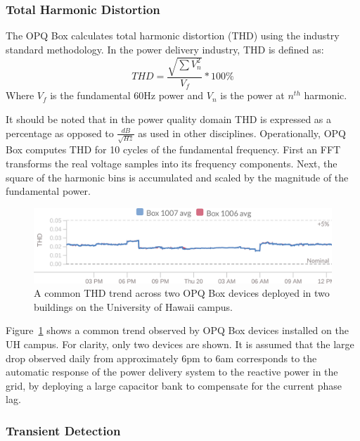 \subsubsection{Total Harmonic Distortion}\label{subsec:thd}

The OPQ Box calculates total harmonic distortion (THD) using the industry standard methodology.
In the power delivery industry, THD is defined as:
\begin{equation} \label{eq:4}
THD = \frac{\sqrt{\sum{V_{n}^2}}}{V_{f}}*100\%
\end{equation}
Where $V_{f}$ is the fundamental 60Hz power and $V_{n}$ is the power at $n^{th}$ harmonic.

It should be noted that in the power quality domain THD is expressed as a percentage as opposed to $\frac{dB}{\sqrt{Hz}}$ as used in other disciplines.
Operationally, OPQ Box computes THD for 10 cycles of the fundamental frequency.
First an FFT transforms the real voltage samples into its frequency components.
Next, the square of the harmonic bins is accumulated and scaled by the magnitude of the fundamental power.

\begin{figure}[h]
	\centering
	\includegraphics[width=1\linewidth]{images/opq-box/thd_two_devices_24_hours.png}
	\caption{A common THD trend across two OPQ Box devices deployed in two buildings on the University of Hawaii campus.}
	\label{fig:opq:7}
\end{figure}

Figure~\ref{fig:opq:7} shows a common trend observed by OPQ Box devices installed on the UH campus.
For clarity, only two devices are shown.
It is assumed that the large drop observed daily from approximately 6pm to 6am corresponds to the automatic response of the power delivery system to the reactive power in the grid, by deploying a large capacitor bank to compensate for the current phase lag.

\subsubsection{Transient Detection}\label{subsec:transient-detection}

